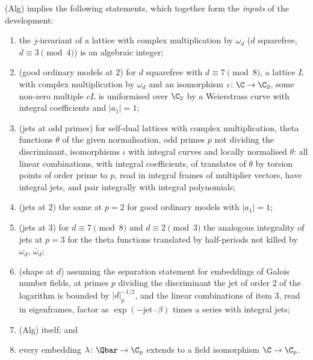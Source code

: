\begin{theorem}\label{pf:reckernel:inputs}
\textup{(Alg)} implies the following statements, which together form the \emph{inputs} of the development:
\begin{enumerate}
\item the $j$-invariant of a lattice with complex multiplication by $\omega_d$ ($d$ squarefree, $d\equiv3\pmod 4$) is an
  algebraic integer;
\item (good ordinary models at $2$) for $d$ squarefree with $d\equiv7\pmod 8$, a lattice $L$ with complex multiplication
  by $\omega_d$ and an isomorphism $\iota\colon\C\to\C_2$, some non-zero multiple $cL$ is uniformised over $\C_2$ by a
  Weierstrass curve with integral coefficients and $|a_1|=1$;
\item (jets at odd primes) for self-dual lattices with complex multiplication, theta functions $\theta$ of the given
  normalisation, odd primes $p$ not dividing the discriminant, isomorphisms $\iota$ with integral curves and locally
  normalised $\theta$: all linear combinations, with integral coefficients, of translates of $\theta$ by torsion points of
  order prime to $p$, read in integral frames of multiplier vectors, have integral jets, and pair integrally with integral
  polynomials;
\item (jets at $2$) the same at $p=2$ for good ordinary models with $|a_1|=1$;
\item (jets at $3$) for $d\equiv7\pmod8$ and $d\equiv2\pmod3$ the analogous integrality of jets at $p=3$ for the theta
  functions translated by half-periods not killed by $\omega_d$, $\bar\omega_d$;
\item (shape at $d$) assuming the separation statement for embeddings of Galois number fields, at primes $p$ dividing the
  discriminant the jet of order $2$ of the logarithm is bounded by $|d|_p^{-1/2}$, and the linear combinations of
  item 3, read in eigenframes, factor as $\exp(-\mathrm{jet}\cdot\beta)$ times a series with integral jets;
\item \textup{(Alg)} itself; and
\item every embedding $\lambda\colon\Qbar\to\C_p$ extends to a field isomorphism $\C\to\C_p$.
\end{enumerate}
\end{theorem}

